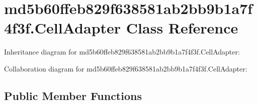 \hypertarget{classmd5b60ffeb829f638581ab2bb9b1a7f4f3f_1_1_cell_adapter}{}\section{md5b60ffeb829f638581ab2bb9b1a7f4f3f.\+Cell\+Adapter Class Reference}
\label{classmd5b60ffeb829f638581ab2bb9b1a7f4f3f_1_1_cell_adapter}


Inheritance diagram for md5b60ffeb829f638581ab2bb9b1a7f4f3f.\+Cell\+Adapter\+:


Collaboration diagram for md5b60ffeb829f638581ab2bb9b1a7f4f3f.\+Cell\+Adapter\+:
\subsection*{Public Member Functions}
